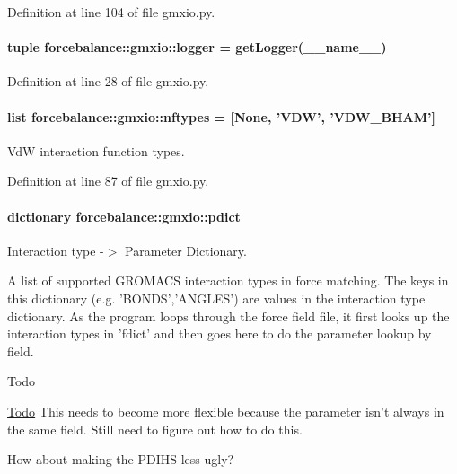 \-Definition at line 104 of file gmxio.\-py.

\hypertarget{namespaceforcebalance_1_1gmxio_a1ba0eaad8ffef47e3afff245dd1e3dcf}{
\paragraph[{logger}]{\setlength{\rightskip}{0pt plus 5cm}tuple {\bf forcebalance\-::gmxio\-::logger} = get\-Logger(\-\_\-\-\_\-name\-\_\-\-\_\-)}}\label{namespaceforcebalance_1_1gmxio_a1ba0eaad8ffef47e3afff245dd1e3dcf}


\-Definition at line 28 of file gmxio.\-py.

\hypertarget{namespaceforcebalance_1_1gmxio_a1273a5830d780475a2d07385c60341f6}{
\paragraph[{nftypes}]{\setlength{\rightskip}{0pt plus 5cm}list {\bf forcebalance\-::gmxio\-::nftypes} = \mbox{[}\-None, '\-V\-D\-W', '\-V\-D\-W\-\_\-\-B\-H\-A\-M'\mbox{]}}}\label{namespaceforcebalance_1_1gmxio_a1273a5830d780475a2d07385c60341f6}


\-Vd\-W interaction function types. 



\-Definition at line 87 of file gmxio.\-py.

\hypertarget{namespaceforcebalance_1_1gmxio_afa3ee5e262ff005d87d20b4ec1581bad}{
\paragraph[{pdict}]{\setlength{\rightskip}{0pt plus 5cm}dictionary {\bf forcebalance\-::gmxio\-::pdict}}}\label{namespaceforcebalance_1_1gmxio_afa3ee5e262ff005d87d20b4ec1581bad}


\-Interaction type -\/$>$ \-Parameter \-Dictionary. 

\-A list of supported \-G\-R\-O\-M\-A\-C\-S interaction types in force matching. \-The keys in this dictionary (e.\-g. '\-B\-O\-N\-D\-S','\-A\-N\-G\-L\-E\-S') are values in the interaction type dictionary. \-As the program loops through the force field file, it first looks up the interaction types in 'fdict' and then goes here to do the parameter lookup by field. \begin{DoxyRefDesc}{\-Todo}
\item[\hyperlink{todo__todo000010}{\-Todo}]\-This needs to become more flexible because the parameter isn't always in the same field. \-Still need to figure out how to do this. 

\-How about making the \-P\-D\-I\-H\-S less ugly? \end{DoxyRefDesc}


